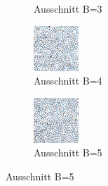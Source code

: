 \begin{figure}[H]
\begin{subfigure}[b]{0.2\linewidth}
         \caption{Ausschnitt B=3}
         \label{pic:screen_B3}
    \end{subfigure}
    \begin{subfigure}[b]{0.2\linewidth}
        \includegraphics[width=\linewidth]{content/TemporalerAlg/Bilder/Sorting/DiffDimensions/4/seed_debug_5.0_small_screen.png}
         \caption{Ausschnitt B=4}
         \label{pic:screen_B4}
    \end{subfigure}
    \begin{subfigure}[b]{0.2\linewidth}
        \includegraphics[width=\linewidth]{content/TemporalerAlg/Bilder/Sorting/DiffDimensions/5/seed_debug_5.0_small_screen.png}
         \caption{Ausschnitt B=5}
         \label{pic:screen_B5}
    \end{subfigure}


\end{figure}
